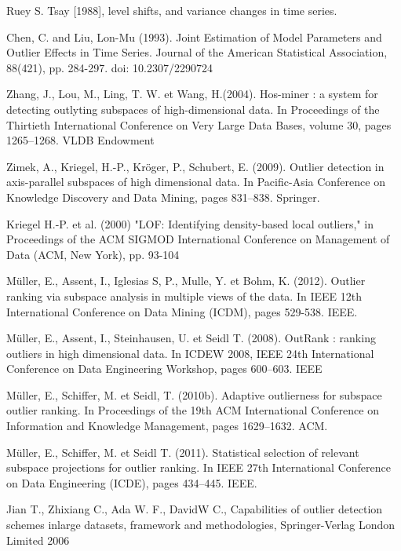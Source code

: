 \begin{thebibliography}{99}
 Ruey S. Tsay [1988], level shifts, and variance changes in time series.

 Chen, C. and Liu, Lon-Mu (1993). Joint Estimation of Model Parameters and Outlier Effects in
Time Series. Journal of the American Statistical Association, 88(421), pp. 284-297. doi: 10.2307/2290724


Zhang, J., Lou, M., Ling, T. W. et Wang, H.(2004). Hos-miner : a system for detecting outlyting subspaces of high-dimensional data. In Proceedings of the Thirtieth International Conference on Very Large Data Bases, volume 30, pages 1265–1268. VLDB Endowment

Zimek, A., Kriegel, H.-P., Kröger, P., Schubert, E. (2009). Outlier detection in axis-parallel subspaces of high dimensional data. In Pacific-Asia Conference on Knowledge Discovery and Data Mining, pages 831–838. Springer.

Kriegel H.-P. et al. (2000) "LOF:  Identifying  density-based  local outliers," in Proceedings  of  the  ACM  SIGMOD  International  Conference  on  Management of Data (ACM, New York), pp. 93-104

Müller, E., Assent, I., Iglesias S, P., Mulle, Y. et Bohm, K. (2012). Outlier ranking via subspace analysis in multiple views of the data. In IEEE 12th International Conference on Data Mining (ICDM), pages 529-538. IEEE.

Müller, E., Assent, I., Steinhausen, U. et Seidl T. (2008). OutRank : ranking outliers in high dimensional
data. In ICDEW 2008, IEEE 24th International Conference on Data Engineering Workshop, pages 600–603. IEEE

Müller, E., Schiffer, M. et Seidl, T. (2010b). Adaptive outlierness for subspace outlier ranking. In Proceedings
of the 19th ACM International Conference on Information and Knowledge Management, pages 1629–1632. ACM.

Müller,  E., Schiffer, M. et Seidl T. (2011). Statistical selection of relevant subspace projections for outlier
ranking. In IEEE 27th International Conference on Data Engineering (ICDE), pages 434–445. IEEE.

Jian T., Zhixiang C.,
Ada W. F., DavidW C., Capabilities of outlier detection schemes inlarge datasets, framework and methodologies, Springer-Verlag London Limited 2006


\end{thebibliography}







